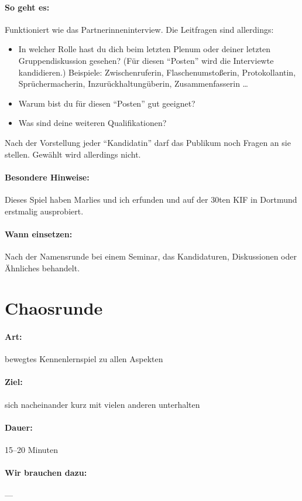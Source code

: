 \paragraph{So geht es:} Funktioniert wie das Partnerinneninterview. Die Leitfragen sind allerdings:
  \begin{itemize}
    \item In welcher Rolle hast du dich beim letzten Plenum oder deiner letzten Gruppendiskussion gesehen? (Für diesen "`Posten"' wird die Interviewte kandidieren.) Beispiele: Zwischenruferin, Flaschenumstoßerin, Protokollantin, Sprüchermacherin, Inzurückhaltungüberin, Zusammenfasserin \ldots
    \item Warum bist du für diesen "`Posten"' gut geeignet?
    \item Was sind deine weiteren Qualifikationen?
  \end{itemize}

Nach der Vorstellung jeder "`Kandidatin"' darf das Publikum noch Fragen an sie stellen. Gewählt wird allerdings nicht.
\paragraph{Besondere Hinweise:} Dieses Spiel haben Marlies und ich erfunden und auf der 30ten KIF in Dortmund erstmalig ausprobiert.
\paragraph{Wann einsetzen:} Nach der Namensrunde bei einem Seminar, das Kandidaturen, Diskussionen oder Ähnliches behandelt.

\section{Chaosrunde}
\paragraph{Art:} bewegtes Kennenlernspiel zu allen Aspekten
\paragraph{Ziel:} sich nacheinander kurz mit vielen anderen unterhalten
\paragraph{Dauer:} 15--20 Minuten
\paragraph{Wir brauchen dazu:} ---
